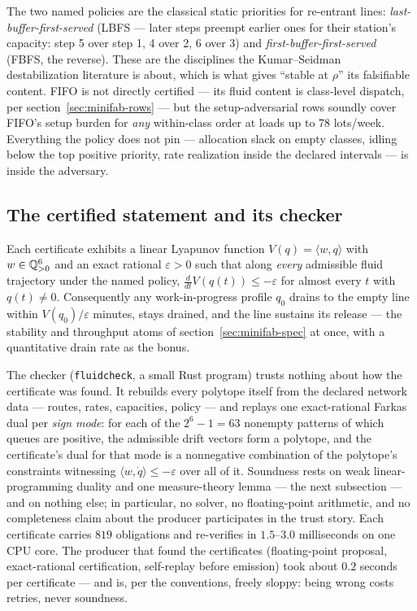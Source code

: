 The two named policies are the classical static priorities for
re-entrant lines: \emph{last-buffer-first-served} (LBFS --- later
steps preempt earlier ones for their station's capacity: step 5 over
step 1, 4 over 2, 6 over 3) and \emph{first-buffer-first-served}
(FBFS, the reverse). These are the disciplines the Kumar--Seidman
destabilization literature is about, which is what gives ``stable at
$\rho$'' its falsifiable content. FIFO is not directly certified --- its
fluid content is class-level dispatch, per
section~\ref{sec:minifab-rows} --- but the setup-adversarial rows
soundly cover FIFO's setup burden for \emph{any} within-class order
at loads up to 78 lots/week. Everything the policy does not pin ---
allocation slack on empty classes, idling below the top positive
priority, rate realization inside the declared intervals --- is
inside the adversary.

\subsection{The certified statement and its checker}

Each certificate exhibits a linear Lyapunov function $V(q) = \langle
w, q \rangle$ with $w \in \mathbb{Q}_{>0}^6$ and an exact rational
$\varepsilon > 0$ such that along \emph{every} admissible fluid
trajectory under the named policy, $\frac{d}{dt} V(q(t)) \le
-\varepsilon$ for almost every $t$ with $q(t) \ne 0$. Consequently
any work-in-progress profile $q_0$ drains to the empty line within
$V(q_0)/\varepsilon$ minutes, stays drained, and the line sustains
its release --- the stability and throughput atoms of
section~\ref{sec:minifab-spec} at once, with a quantitative drain
rate as the bonus.

The checker (\texttt{fluidcheck}, a small Rust program) trusts nothing about how the certificate
was found. It rebuilds every polytope itself from the declared
network data --- routes, rates, capacities, policy --- and replays
one exact-rational Farkas dual per \emph{sign mode}: for each of the
$2^6 - 1 = 63$ nonempty patterns of which queues are positive, the
admissible drift vectors form a polytope, and the certificate's dual
for that mode is a nonnegative combination of the polytope's
constraints witnessing $\langle w, \dot q \rangle \le -\varepsilon$
over all of it. Soundness rests on weak linear-programming duality
and one measure-theory lemma --- the next subsection --- and on
nothing else; in particular, no solver, no floating-point arithmetic,
and no completeness claim about the producer participates in the
trust story. Each certificate carries $819$ obligations and
re-verifies in $1.5$--$3.0$ milliseconds on one CPU core. The
producer that found the certificates (floating-point proposal,
exact-rational certification, self-replay before emission) took
about $0.2$ seconds per certificate --- and is, per the conventions,
freely sloppy: being wrong costs retries, never soundness.

